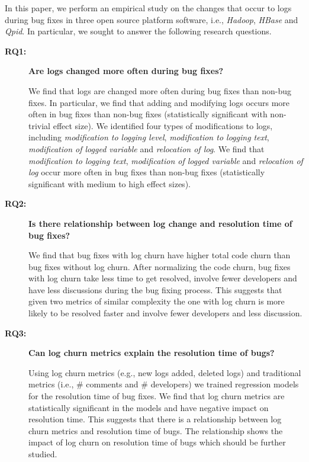 %
%
%

In this paper, we perform an empirical study on the changes that occur to logs during bug fixes in three open source platform software, i.e., \emph{Hadoop}, \emph{HBase} and \emph{Qpid}. In particular, we sought to answer the following research questions. 

\begin{description}
\item[\textbf{RQ1:}]\textbf{Are logs changed more often during bug fixes?} 

We find that logs are changed more often during bug fixes than non-bug fixes. In particular, we find that adding and modifying logs occurs more often in bug fixes than non-bug fixes (statistically significant with non-trivial effect size). We identified four types of modifications to logs, including \emph{modification to logging level}, \emph{modification to logging text}, \emph{modification of logged variable} and \emph{relocation of log}. We find that \emph{modification to logging text}, \emph{modification of logged variable} and \emph{relocation of log} occur more often in bug fixes than non-bug fixes (statistically significant with medium to high effect sizes). 



\item[\textbf{RQ2:}]\textbf{Is there relationship between log change and resolution time of bug fixes?}

We find that bug fixes with log churn have higher total code churn than bug fixes without log churn. After normalizing the code churn, bug fixes with log churn take less time to get resolved, involve fewer developers and have less discussions during the bug fixing process. This suggests that given two metrics of similar complexity the one with log churn is more likely to be resolved faster and involve fewer developers and less discussion. 



\item[\textbf{RQ3:}]\textbf{Can log churn metrics explain the resolution time of bugs?}

Using log churn metrics (e.g., new logs added, deleted logs) and traditional metrics (i.e., \# comments and \# developers) we trained regression models for the resolution time of bug fixes. We find that log churn metrics are statistically significant in the models and have negative impact on resolution time. This suggests that there is a relationship between log churn metrics and resolution time of bugs. The relationship shows the impact of log churn on resolution time of bugs which should be further studied. 

\end{description}


